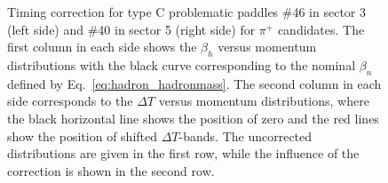 \begin{figure}[htp]
\begin{center}
\caption{\small Timing correction for type C problematic paddles \#46 in sector 3 (left side) and \#40 in sector 5 (right side) for $\pi^+$ candidates. The first column in each side shows the $\beta_{h}$ versus momentum distributions with the black curve corresponding to the nominal $\beta_{n}$ defined by Eq.~\eqref{eq:hadron_hadronmass}. The second column in each side corresponds to the $\Delta T$ versus momentum distributions, where the black horizontal line shows the position of zero and the red lines show the position of shifted $\Delta T$-bands. The uncorrected distributions are given in the first row, while the influence of the correction is shown in the second row. \label{fig:double_paddles}} 
\end{center}
\end{figure}

